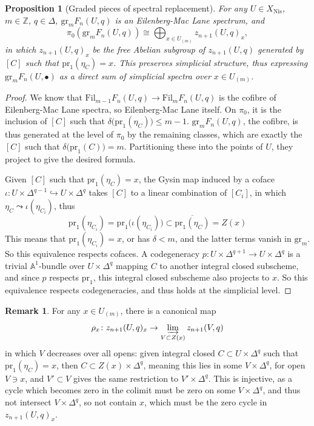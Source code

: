 \documentclass[11pt, twoside]{article}
\numberwithin{equation}{section}
\newtheorem{proposition}[equation]{Proposition}
\theoremstyle{definition}
\newtheorem{remark}[equation]{Remark}
\newcommand{\bb}[1]{\mathbb{#1}}
\newcommand{\colim}{\varinjlim}
\newcommand{\pr}{\mathrm{pr}}
\newcommand{\fil}{\mathrm{Fil}}
\newcommand{\gr}{\mathrm{gr}}
\newcommand{\nis}{\mathrm{Nis}}
\begin{document}
\begin{proposition}[Graded pieces of spectral replacement]\label{prop:gr-sp-rep}
For any \(U \in X_\nis\), \(m \in \bb{Z}\), \(q \in \Delta\), \(\gr_m F_n(U, q)\) is an Eilenberg-Mac Lane spectrum, and 
\begin{equation}
\pi_0 \! \left(\gr_m F_n(U, q)\right) \cong \bigoplus_{x \in U_{(m)}} z_{n + 1}(U, q)_x,
\end{equation}
in which \(z_{n + 1}(U, q)_x\) be the free Abelian subgroup of \(z_{n + 1}(U, q)\) generated by \([C]\) such that \(\pr_1(\eta_C) = x\). This preserves simplicial structure, thus expressing \(\gr_m F_n(U, \bullet)\) as a direct sum of simplicial spectra over \(x \in U_{(m)}\).
\end{proposition}

\begin{proof}
We know that \(\fil_{m - 1} F_n(U, q) \to \fil_m F_n(U, q)\) is the cofibre of Eilenberg-Mac Lane spectra, so Eilenberg-Mac Lane itself. On \(\pi_0\), it is the inclusion of \([C]\) such that \(\delta\big(\pr_1(\eta_C)\big) \leq m - 1\). \(\gr_m F_n(U, q)\), the cofibre, is thus generated at the level of \(\pi_0\) by the remaining classes, which are exactly the \([C]\) such that \(\delta(\pr_1(C)\big) = m\). Partitioning these into the points of \(U\), they project to give the desired formula.

Given \([C]\) such that \(\pr_1(\eta_C) = x\), the Gysin map induced by a coface \(\iota \colon U \times \Delta^{q - 1} \hookrightarrow U \times \Delta^q\) takes \([C]\) to a linear combination of \([C_i]\), in which \(\eta_C \leadsto \iota(\eta_{C_i})\), thus 
\[\pr_1(\eta_{C_i}) = \pr_1\big(\iota(\eta_{C_i})\big) \subset \overline{\pr_1(\eta_C)} = Z(x)\]
This means that \(\pr_1(\eta_{C_i}) = x\), or has \(\delta < m\), and the latter terms vanish in \(\gr_m\). So this equivalence respects cofaces. A codegeneracy \(p \colon U \times \Delta^{q + 1} \to U \times \Delta^q\) is a trivial \(\bb{A}^1\)-bundle over \(U \times \Delta^q\) mapping \(C\) to another integral closed subscheme, and since \(p\) respects \(\pr_1\), this integral closed subscheme also projects to \(x\). So this equivalence respects codegeneracies, and thus holds at the simplicial level.
\end{proof}

\begin{remark}\label{rem:cyc-res}
For any \(x \in U_{(m)}\), there is a canonical map 
\[\rho_x \colon z_{n + 1}(U, q)_x \to \colim_{V \subset Z(x)} z_{n + 1}(V, q)\]
in which \(V\) decreases over all opens: given integral closed \(C \subset U \times \Delta^q\) such that \(\pr_1(\eta_C) = x\), then \(C \subset Z(x) \times \Delta^q\), meaning this lies in some \(V \times \Delta^q\), for open \(V \ni x\), and \(V' \subset V\) gives the same restriction to \(V' \times \Delta^q\). This is injective, as a cycle which becomes zero in the colimit must be zero on some \(V \times \Delta^q\), and thus not intersect \(V \times \Delta^q\), so not contain \(x\), which must be the zero cycle in \(z_{n + 1}(U, q)_x\).
\end{remark}
\end{document}
